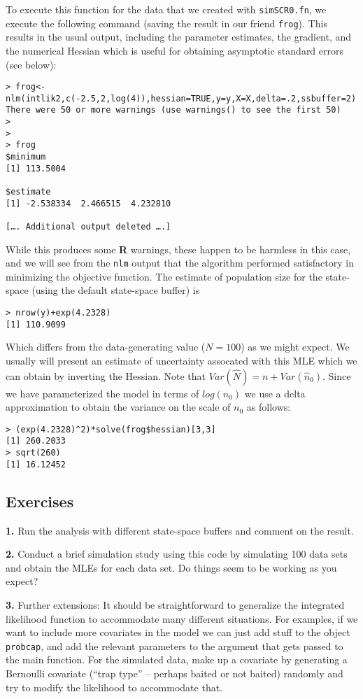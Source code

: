 To execute this function for the data that we created with \mbox{\tt simSCR0.fn},
 we execute the following command (saving the result in our
friend \mbox{\tt frog}).
This results in the usual output, including the parameter estimates,
the gradient, and the numerical Hessian which is useful for obtaining
asymptotic standard errors (see below):
\begin{verbatim}
> frog<-nlm(intlik2,c(-2.5,2,log(4)),hessian=TRUE,y=y,X=X,delta=.2,ssbuffer=2)
There were 50 or more warnings (use warnings() to see the first 50)
> 
>
> frog
$minimum
[1] 113.5004

$estimate
[1] -2.538334  2.466515  4.232810

[…. Additional output deleted ….]
\end{verbatim}
While this produces some {\bf R} warnings, these happen to be harmless
in this case, and we will see from the \mbox{\tt nlm} output that the
algorithm performed satisfactory in minimizing the objective function.
The estimate of population size for the state-space (using the default 
state-space buffer) is
\begin{verbatim}
> nrow(y)+exp(4.2328)
[1] 110.9099
\end{verbatim}
Which differs from the data-generating value ($N=100$) as we might
expect. We usually will present an estimate of uncertainty assocated
with this MLE which we can obtain by inverting the Hessian. Note that
$Var(\hat{N}) = n + Var(\hat{n}_{0})$.
Since we
have parameterized the model in terms of $log(n_{0})$ we use a delta
approximation to obtain the variance on the scale of $n_{0}$ as
follows:
\begin{verbatim}
> (exp(4.2328)^2)*solve(frog$hessian)[3,3]
[1] 260.2033
> sqrt(260)
[1] 16.12452
\end{verbatim}

\subsection{Exercises}

{\flushleft 
{\bf 1.}	
Run the analysis with different state-space buffers and comment on the result. 
}


{\flushleft 
{\bf 2.} Conduct a brief simulation study using this code by
  simulating 100 data sets and obtain the MLEs for each data set. Do
  things seem to be working as you expect?  }

{\flushleft 
{\bf 3.} 
Further extensions: It should be straightforward to
  generalize the integrated likelihood function to accommodate many
  different situations. For examples, if we want to include more
  covariates in the model we can just add stuff to the object \mbox{\tt probcap},
 and add the relevant parameters to the argument that gets
  passed to the main  function.  For the simulated data, make up a
  covariate by generating a Bernoulli covariate (``trap type'' – perhaps
  baited or not baited) randomly and try to modify the likelihood to
  accommodate that.  }

